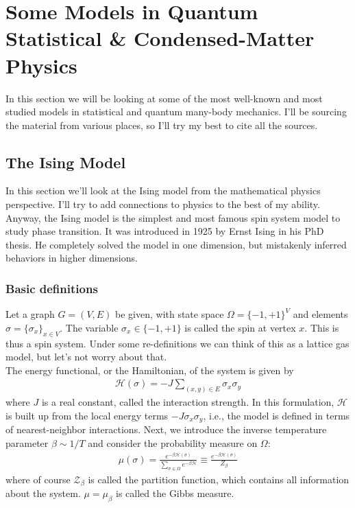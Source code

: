 \documentclass{book}
\theoremstyle{definition}
\newcommand{\had}{\mathcal{H}}
\newcommand{\f}[2]{\frac{#1}{#2}}
\newcommand{\Z}{\mathcal{Z}}
\begin{document}
\section{Some Models in Quantum Statistical \& Condensed-Matter Physics}

In this section we will be looking at some of the most well-known and most studied models in statistical and quantum many-body mechanics. I'll be sourcing the material from various places, so I'll try my best to cite all the sources. 


\subsection{The Ising Model}
In this section we'll look at the Ising model from the mathematical physics perspective. I'll try to add connections to physics to the best of my ability. \\

Anyway, the Ising model is the simplest and most famous spin system model to study phase transition. It was introduced in 1925 by Ernst Ising in his PhD thesis. He completely solved the model in one dimension, but mistakenly inferred behaviors in higher dimensions. \\

\subsubsection{Basic definitions}

Let a graph $G = (V,E)$ be given, with state space $\Omega = \{ -1,+1 \}^V$ and elements $\sigma = \{ \sigma_x \}_{x\in V}$. The variable $\sigma_x \in \{ -1,+1\}$ is called the spin at vertex $x$. This is thus a spin system. Under some re-definitions we can think of this as a lattice gas model, but let's not worry about that. \\

The energy functional, or the Hamiltonian, of the system is given by
\begin{align}
\had(\sigma) = -J \sum_{(x,y)\in E} \sigma_x \sigma_y
\end{align}
where $J$ is a real constant, called the interaction strength. In this formulation, $\had$ is built up from the local energy terms $-J \sigma_x \sigma_y$, i.e., the model is defined in terms of nearest-neighbor interactions. Next, we introduce the inverse temperature parameter $\beta \sim 1/T$ and consider the probability measure on $\Omega$:
\begin{align}
\mu(\sigma) = \f{e^{-\beta \had(\sigma)}}{\sum_{\sigma \in \Omega} e^{-\beta\had}} \equiv \f{e^{-\beta \had(\sigma)}}{Z_\beta}
\end{align}
where of course $\Z_\beta$ is called the partition function, which contains all information about the system. $\mu = \mu_\beta$ is called the Gibbs measure. \\
\end{document}
